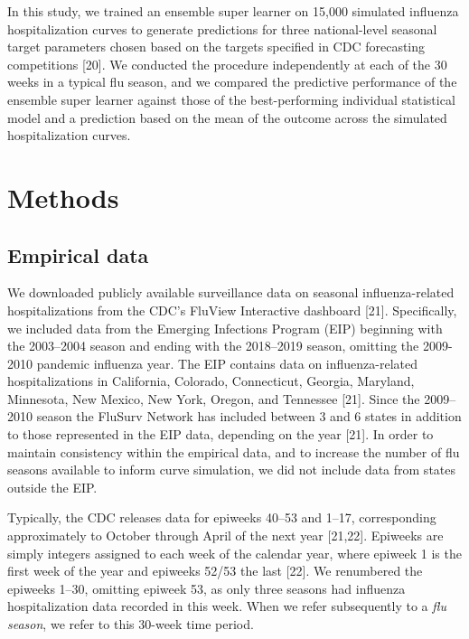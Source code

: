 \documentclass[10pt,letterpaper]{article}
\begin{document}
In this study, we trained an ensemble super learner on 15,000 simulated
influenza hospitalization curves to generate predictions for three
national-level seasonal target parameters chosen based on the targets
specified in CDC forecasting competitions {[}20{]}. We conducted the
procedure independently at each of the 30 weeks in a typical flu season,
and we compared the predictive performance of the ensemble super learner
against those of the best-performing individual statistical model and a
prediction based on the mean of the outcome across the simulated
hospitalization curves.

\hypertarget{methods}{%
\section{Methods}\label{methods}}

\hypertarget{empirical-data}{%
\subsection{Empirical data}\label{empirical-data}}

We downloaded publicly available surveillance data on seasonal
influenza-related hospitalizations from the CDC's FluView Interactive
dashboard {[}21{]}. Specifically, we included data from the Emerging
Infections Program (EIP) beginning with the 2003--2004 season and ending
with the 2018--2019 season, omitting the 2009-2010 pandemic influenza
year. The EIP contains data on influenza-related hospitalizations in
California, Colorado, Connecticut, Georgia, Maryland, Minnesota, New
Mexico, New York, Oregon, and Tennessee {[}21{]}. Since the 2009--2010
season the FluSurv Network has included between 3 and 6 states in
addition to those represented in the EIP data, depending on the year
{[}21{]}. In order to maintain consistency within the empirical data,
and to increase the number of flu seasons available to inform curve
simulation, we did not include data from states outside the EIP.

Typically, the CDC releases data for epiweeks 40--53 and 1--17,
corresponding approximately to October through April of the next year
{[}21,22{]}. Epiweeks are simply integers assigned to each week of the
calendar year, where epiweek 1 is the first week of the year and
epiweeks 52/53 the last {[}22{]}. We renumbered the epiweeks 1--30,
omitting epiweek 53, as only three seasons had influenza hospitalization
data recorded in this week. When we refer subsequently to a \emph{flu
season}, we refer to this 30-week time period.
\end{document}

